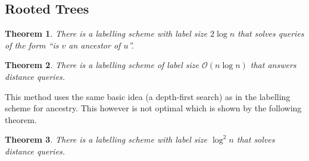 \documentclass[a4paper, 12pt]{article}
\theoremstyle{plain}
\newtheorem{theorem}{Theorem}[section] %
\theoremstyle{definition}
\theoremstyle{lemma}
\theoremstyle{remark}
\theoremstyle{corollary}
\theoremstyle{example}
\begin{document}
	\subsection{Rooted Trees}
	\begin{theorem}
		There is a labelling scheme with label size $2 \log n$ that solves queries of the form ``is $v$ an ancestor of $u$''.
	\end{theorem}
	\begin{theorem}
		There is a labelling scheme of label size $\mathcal{O}(n \log n)$ that answers distance queries. 
	\end{theorem}
	This method uses the same basic idea (a depth-first search) as in the labelling scheme for ancestry. This however is not optimal which is shown by the following theorem.
	\begin{theorem}
		There is a labelling scheme with label size $\log^2 n$ that solves distance queries.
	\end{theorem}
\end{document}
